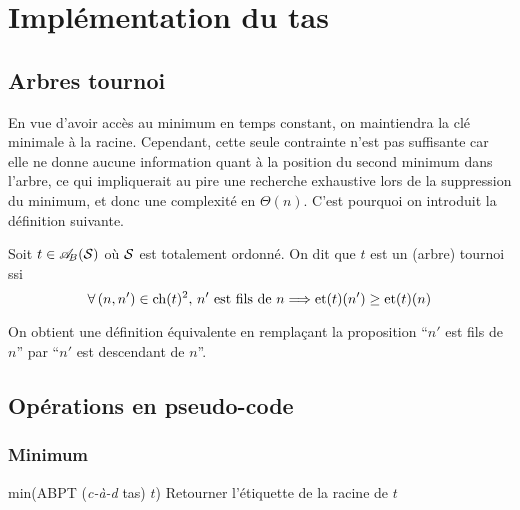 \section{Implémentation du tas}
	
	\subsection{Arbres tournoi}
	
	En vue d'avoir accès au minimum en temps constant, on maintiendra la clé minimale à la racine. Cependant, cette seule contrainte n'est pas suffisante car elle ne donne aucune information quant à la position du second minimum dans l'arbre, ce qui impliquerait au pire une recherche exhaustive lors de la suppression du minimum, et donc une complexité en \(\Theta(n)\). \nt
	C'est pourquoi on introduit la définition suivante.
	
	\eqskip{2mm}
	\begin{Definition}
		Soit \(t\in\ABS\) où \(\cal{S}\) est totalement ordonné. On dit que \(t\) est un (arbre) tournoi ssi
			\[
				\forall\,(n,n')\in\ch(t)^2,\, n' \text{ est fils de } n \Longrightarrow \et(t)(n') \geq \et(t)(n)
			\]
	\end{Definition}
	
	\begin{Remarque}
		On obtient une définition équivalente en remplaçant la proposition ``\(n'\) est fils de \(n\)'' par ``\(n'\) est descendant de \(n\)''.
	\end{Remarque}
	
	\pagebreak
	\subsection{Opérations en pseudo-code}
	
		\subsubsection{Minimum}
			
			\begin{pscode}{min}{(ABPT (\emph{c-à-d} tas) \(t\))}{}{}
				Retourner l'étiquette de la racine de \(t\)				
			\end{pscode}
		
